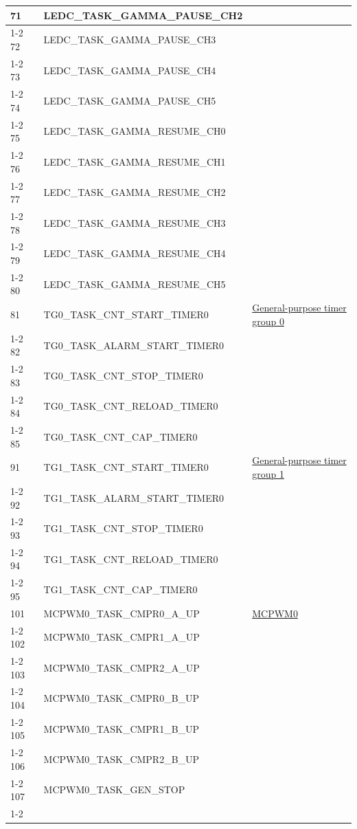 \documentclass[main\_\_EN.tex]{subfiles}
\begin{document}
\begin{longtable}{ | l | l | l | }
71  & LEDC\_TASK\_GAMMA\_PAUSE\_CH2 & \\ \cline{1-2}
72  & LEDC\_TASK\_GAMMA\_PAUSE\_CH3 & \\ \cline{1-2}
73  & LEDC\_TASK\_GAMMA\_PAUSE\_CH4 & \\ \cline{1-2}
74  & LEDC\_TASK\_GAMMA\_PAUSE\_CH5 & \\ \cline{1-2}
75  & LEDC\_TASK\_GAMMA\_RESUME\_CH0& \\ \cline{1-2}
76  & LEDC\_TASK\_GAMMA\_RESUME\_CH1& \\ \cline{1-2}
77  & LEDC\_TASK\_GAMMA\_RESUME\_CH2& \\ \cline{1-2}
78  & LEDC\_TASK\_GAMMA\_RESUME\_CH3& \\ \cline{1-2}
79  & LEDC\_TASK\_GAMMA\_RESUME\_CH4& \\ \cline{1-2}
80  & LEDC\_TASK\_GAMMA\_RESUME\_CH5& \\ \hline
81  & TG0\_TASK\_CNT\_START\_TIMER0     & \hyperref[mod:timg]{General-purpose timer group 0}\\ \cline{1-2}
82  & TG0\_TASK\_ALARM\_START\_TIMER0   & \\ \cline{1-2}
83  & TG0\_TASK\_CNT\_STOP\_TIMER0      & \\ \cline{1-2}
84  & TG0\_TASK\_CNT\_RELOAD\_TIMER0    & \\ \cline{1-2}
85  & TG0\_TASK\_CNT\_CAP\_TIMER0       & \\ \hline
91 & TG1\_TASK\_CNT\_START\_TIMER0     & \hyperref[mod:timg]{General-purpose timer group 1}\\ \cline{1-2}
92 & TG1\_TASK\_ALARM\_START\_TIMER0   & \\ \cline{1-2}
93 & TG1\_TASK\_CNT\_STOP\_TIMER0      & \\ \cline{1-2}
94 & TG1\_TASK\_CNT\_RELOAD\_TIMER0    & \\ \cline{1-2}
95 & TG1\_TASK\_CNT\_CAP\_TIMER0       & \\ \hline
101 & MCPWM0\_TASK\_CMPR0\_A\_UP& \hyperref[mod:mcpwm]{MCPWM0}\\ \cline{1-2}
102 & MCPWM0\_TASK\_CMPR1\_A\_UP& \\ \cline{1-2}
103 & MCPWM0\_TASK\_CMPR2\_A\_UP& \\ \cline{1-2}
104 & MCPWM0\_TASK\_CMPR0\_B\_UP& \\ \cline{1-2}
105 & MCPWM0\_TASK\_CMPR1\_B\_UP& \\ \cline{1-2}
106 & MCPWM0\_TASK\_CMPR2\_B\_UP& \\ \cline{1-2}
107 & MCPWM0\_TASK\_GEN\_STOP & \\ \cline{1-2}

\end{longtable}
\end{document}
